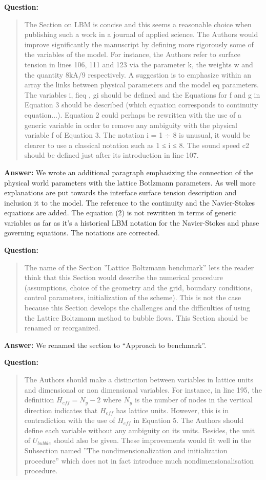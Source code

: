 \documentclass{article}
\begin{document}
\textbf{Question:}
\begin{quotation}
The Section on LBM is concise and this seems a reasonable choice when publishing such a work in a
journal of applied science. The Authors would improve signiﬁcantly the manuscript by deﬁning more
rigorously some of the variables of the model. For instance, the Authors refer to surface tension in
lines 106, 111 and 123 via the parameter k, the weights w and the quantity 8kA/9 respectively.
A suggestion is to emphasize within an array the links between physical parameters and the model
eq
parameters. The variables i, fieq , gi should be deﬁned and the Equations for f and g in Equation
3 should be described (which equation corresponds to continuity equation...). Equation 2 could
perhaps be rewritten with the use of a generic variable in order to remove any ambiguity with the
physical variable f of Equation 3. The notation i = 1 ÷ 8 is unusual, it would be clearer to use a
classical notation such as 1 ≤ i ≤ 8. The sound speed c2 should be deﬁned just after its
introduction in line 107.
\end{quotation}

\textbf{Answer:} We wrote an additional paragraph emphasizing the connection of the physical world
parameters with the lattice Botlzmann parameters. As well more explanations are put towards the
interface surface tension description and inclusion it to the model. The reference to the
continuity and the Navier-Stokes equations are added. The equation (2) is not rewritten in terms of
generic variables as far as it's a historical LBM notation for the Navier-Stokes and phase
governing equations. The notations are corrected.

\textbf{Question:}
\begin{quotation}
The name of the Section ”Lattice Boltzmann benchmark” lets the reader think that this Section
would describe the numerical procedure (assumptions, choice of the geometry and the grid, boundary
conditions, control parameters, initialization of the scheme). This is not the case because this
Section
develops the challenges and the difficulties of using the Lattice Boltzmann method to bubble ﬂows.
This Section should be renamed or reorganized.
\end{quotation}

\textbf{Answer:} We renamed the section to ``Approach to benchmark''.

\textbf{Question:}
\begin{quotation}
The Authors should make a distinction between variables in lattice units and dimensional or non
dimensional variables. For instance, in line 195, the definition $H_{eff} = N_y − 2$ where $N_y$ is
the
number of nodes in the vertical direction indicates that $H_{eff}$ has lattice units. However, this
is in
contradiction with the use of $H_{eff}$ in Equation 5. The Authors should deﬁne each variable
without
any ambiguity on its units. Besides, the unit of $U_{bubble}$ should also be given. These
improvements
would ﬁt well in the Subsection named ”The nondimensionalization and initialization procedure”
which does not in fact introduce much nondimensionalisation procedure.
\end{quotation}
\end{document}
